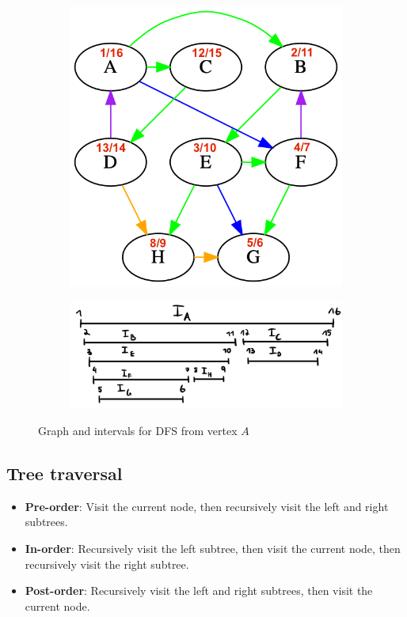 \documentclass[a3paper, landscape, 11pt]{article} %
\begin{document}
\begin{multicols*}{4}
\begin{figure}[H]
\centering
  \begin{subfigure}[c]{0.4\columnwidth}
    \centering
    \includegraphics[width=1\textwidth]{images/edge-types-markup.png}
    \label{fig:image4}
  \end{subfigure}
  \begin{subfigure}[c]{0.58\columnwidth}
    \centering
    \includegraphics[width=1\textwidth]{images/interval-graph.jpeg}
    \label{fig:image5}
  \end{subfigure}
  \caption*{Graph and intervals for DFS from vertex $A$}
\end{figure}

\hrulefill %

\subsection*{Tree traversal}
\begin{itemize}
\item \textbf{Pre-order}: Visit the current node, then recursively visit the left and right subtrees.
\item \textbf{In-order}: Recursively visit the left subtree, then visit the current node, then recursively visit the right subtree.
\item \textbf{Post-order}: Recursively visit the left and right subtrees, then visit the current node.
\end{itemize}


\end{multicols*}
\end{document}
